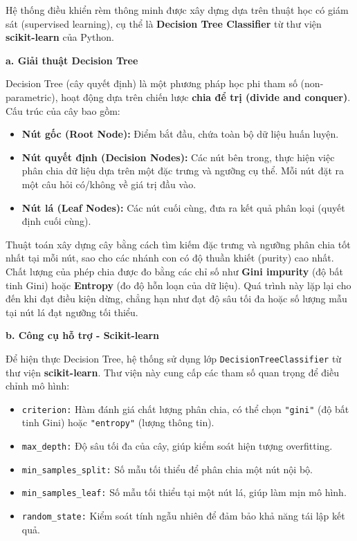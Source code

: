Hệ thống điều khiển rèm thông minh được xây dựng dựa trên thuật học có giám sát (supervised learning), cụ thể là \textbf{Decision Tree Classifier} từ thư viện \textbf{scikit-learn} của Python.

\textbf{a. Giải thuật Decision Tree}

Decision Tree (cây quyết định) là một phương pháp học phi tham số (non-parametric), hoạt động dựa trên chiến lược \textbf{chia để trị (divide and conquer)}. Cấu trúc của cây bao gồm:

\begin{itemize}
    \item \textbf{Nút gốc (Root Node):} Điểm bắt đầu, chứa toàn bộ dữ liệu huấn luyện.
    \item \textbf{Nút quyết định (Decision Nodes):} Các nút bên trong, thực hiện việc phân chia dữ liệu dựa trên một đặc trưng và ngưỡng cụ thể. Mỗi nút đặt ra một câu hỏi có/không về giá trị đầu vào.
    \item \textbf{Nút lá (Leaf Nodes):} Các nút cuối cùng, đưa ra kết quả phân loại (quyết định cuối cùng).
\end{itemize}

Thuật toán xây dựng cây bằng cách tìm kiếm đặc trưng và ngưỡng phân chia tốt nhất tại mỗi nút, sao cho các nhánh con có độ thuần khiết (purity) cao nhất. Chất lượng của phép chia được đo bằng các chỉ số như \textbf{Gini impurity} (độ bất tinh Gini) hoặc \textbf{Entropy} (đo độ hỗn loạn của dữ liệu). Quá trình này lặp lại cho đến khi đạt điều kiện dừng, chẳng hạn như đạt độ sâu tối đa hoặc số lượng mẫu tại nút lá đạt ngưỡng tối thiểu.

\textbf{b. Công cụ hỗ trợ - Scikit-learn}

Để hiện thực Decision Tree, hệ thống sử dụng lớp \texttt{DecisionTreeClassifier} từ thư viện \textbf{scikit-learn}. Thư viện này cung cấp các tham số quan trọng để điều chỉnh mô hình:

\begin{itemize}
    \item \texttt{criterion:} Hàm đánh giá chất lượng phân chia, có thể chọn \texttt{"gini"} (độ bất tinh Gini) hoặc \texttt{"entropy"} (lượng thông tin).
    \item \texttt{max\_depth:} Độ sâu tối đa của cây, giúp kiểm soát hiện tượng overfitting.
    \item \texttt{min\_samples\_split:} Số mẫu tối thiểu để phân chia một nút nội bộ.
    \item \texttt{min\_samples\_leaf:} Số mẫu tối thiểu tại một nút lá, giúp làm mịn mô hình.
    \item \texttt{random\_state:} Kiểm soát tính ngẫu nhiên để đảm bảo khả năng tái lập kết quả.
\end{itemize}

